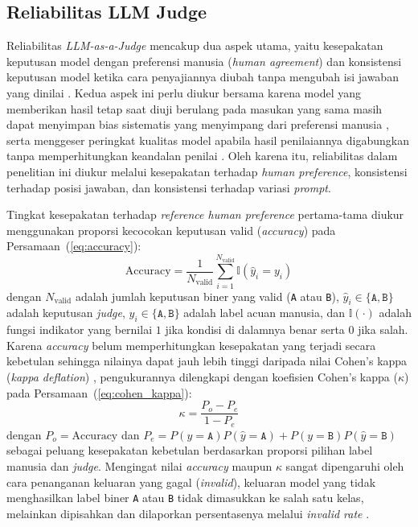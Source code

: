 \subsection{Reliabilitas LLM Judge}

Reliabilitas \textit{LLM-as-a-Judge} mencakup dua aspek utama, yaitu kesepakatan keputusan model dengan preferensi manusia (\textit{human agreement}) dan konsistensi keputusan model ketika cara penyajiannya diubah tanpa mengubah isi jawaban yang dinilai \cite{guSurveyLLMasaJudge2025}\cite{normanReliabilityValiditySystematic2026}. Kedua aspek ini perlu diukur bersama karena model yang memberikan hasil tetap saat diuji berulang pada masukan yang sama masih dapat menyimpan bias sistematis yang menyimpang dari preferensi manusia \cite{anghelDiagnosingBiasInstability2025}\cite{normanReliabilityValiditySystematic2026}, serta menggeser peringkat kualitas model apabila hasil penilaiannya digabungkan tanpa memperhitungkan keandalan penilai \cite{xuJudgeAwareRankingFramework2026}. Oleh karena itu, reliabilitas dalam penelitian ini diukur melalui kesepakatan terhadap \textit{human preference}, konsistensi terhadap posisi jawaban, dan konsistensi terhadap variasi \textit{prompt}.

Tingkat kesepakatan terhadap \textit{reference human preference} pertama-tama diukur menggunakan proporsi kecocokan keputusan valid (\textit{accuracy}) pada Persamaan~(\ref{eq:accuracy}):
\begin{equation}
  \text{Accuracy} = \frac{1}{N_{\text{valid}}} \sum_{i=1}^{N_{\text{valid}}} \mathbb{I}\left(\hat{y}_i = y_i\right)
  \label{eq:accuracy}
\end{equation}
dengan $N_{\text{valid}}$ adalah jumlah keputusan biner yang valid (\texttt{A} atau \texttt{B}), $\hat{y}_i \in \{\texttt{A}, \texttt{B}\}$ adalah keputusan \textit{judge}, $y_i \in \{\texttt{A}, \texttt{B}\}$ adalah label acuan manusia, dan $\mathbb{I}(\cdot)$ adalah fungsi indikator yang bernilai $1$ jika kondisi di dalamnya benar serta $0$ jika salah. Karena \textit{accuracy} belum memperhitungkan kesepakatan yang terjadi secara kebetulan \cite{raoAgreementMetricsLLMasJudge2026}\cite{thakurJudgingJudgesEvaluating2025} sehingga nilainya dapat jauh lebih tinggi daripada nilai Cohen's kappa (\textit{kappa deflation}) \cite{normanReliabilityValiditySystematic2026}, pengukurannya dilengkapi dengan koefisien Cohen's kappa ($\kappa$) \cite{normanReliabilityValiditySystematic2026}\cite{raoAgreementMetricsLLMasJudge2026} pada Persamaan~(\ref{eq:cohen_kappa}):
\begin{equation}
  \kappa = \frac{P_o - P_e}{1 - P_e}
  \label{eq:cohen_kappa}
\end{equation}
dengan $P_o = \text{Accuracy}$ dan $P_e = P(y = \texttt{A})P(\hat{y} = \texttt{A}) + P(y = \texttt{B})P(\hat{y} = \texttt{B})$ sebagai peluang kesepakatan kebetulan berdasarkan proporsi pilihan label manusia dan \textit{judge}. Mengingat nilai \textit{accuracy} maupun $\kappa$ sangat dipengaruhi oleh cara penanganan keluaran yang gagal (\textit{invalid}), keluaran model yang tidak menghasilkan label biner \texttt{A} atau \texttt{B} tidak dimasukkan ke salah satu kelas, melainkan dipisahkan dan dilaporkan persentasenya melalui \textit{invalid rate} \cite{raoAgreementMetricsLLMasJudge2026}.


